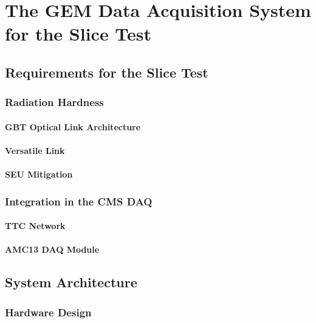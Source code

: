 \chapter{The GEM Data Acquisition System for the Slice Test}
\label{chap:slice_test}

    \section{Requirements for the Slice Test}

        \subsection{Radiation Hardness}

            \subsubsection{GBT Optical Link Architecture}

            \subsubsection{Versatile Link}

            \subsubsection{SEU Mitigation}

        \subsection{Integration in the CMS DAQ}

            \subsubsection{TTC Network}

            \subsubsection{AMC13 DAQ Module}

    \section{System Architecture}

        \subsection{Hardware Design}

